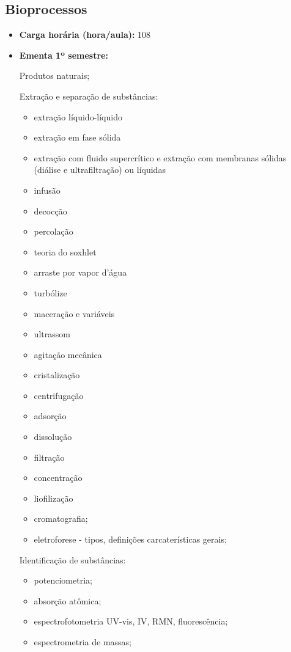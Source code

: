 \documentclass[11pt,fleqn]{book} %
\begin{document}
\subsection{Bioprocessos}\label{disc:bioprocessos}
\begin{itemize}
	\item \textbf{Carga horária (hora/aula):} 108
	\item \textbf{Ementa 1º semestre:}
	
	Produtos naturais;
	
	Extração e separação de substâncias:
	
	\begin{itemize}
		\item extração líquido-líquido
		\item extração em fase sólida
		\item extração com fluido supercrítico e extração com membranas sólidas (diálise e ultrafiltração) ou líquidas
		\item infusão
		\item decocção
		\item percolação
		\item teoria do soxhlet
		\item arraste por vapor d’água
		\item turbólize
		\item maceração e variáveis
		\item ultrassom
		\item agitação mecânica
		\item cristalização
		\item centrifugação
		\item adsorção
		\item dissolução
		\item filtração
		\item concentração
		\item liofilização
		\item cromatografia;
		\item eletroforese - tipos, definições carcaterísticas gerais;
	\end{itemize}
	
	Identificação de substâncias: 
	
	\begin{itemize}
		\item potenciometria; 
		\item absorção atômica;
		\item espectrofotometria UV-vis, IV, RMN, fluorescência;
		\item espectrometria de massas;
	\end{itemize}
		

\end{itemize}
\end{document}
